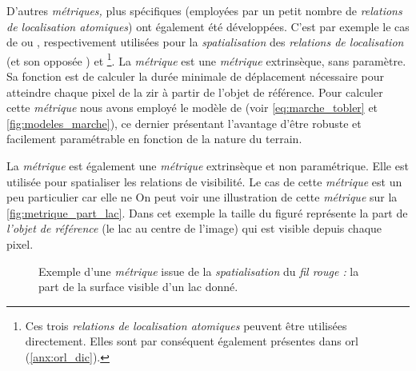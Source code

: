 D'autres \emph{métriques,} plus spécifiques (\ie employées par un
petit nombre de \emph{relations de localisation atomiques}) ont
également été développées. C'est par exemple le cas de
 ou , respectivement
utilisées pour la \emph{spatialisation} des \emph{relations de
  localisation}  (et son opposée
) et 
\footnote{Ces trois \emph{relations de localisation atomiques} peuvent
  être utilisées directement. Elles sont par conséquent également
  présentes dans \ac{orl} (\autoref{anx:orl_dic}).}. La
\emph{métrique}  est une \emph{métrique}
extrinsèque, sans paramètre. Sa fonction est de calculer la durée
minimale de déplacement nécessaire pour atteindre chaque pixel de la
\ac{zir} à partir de l'objet de référence. Pour calculer cette
\emph{métrique} nous avons employé le modèle de \textcite{Tobler1993}
(voir \autoref{eq:marche_tobler} et \autoref{fig:modeles_marche}), ce
dernier présentant l'avantage d'être robuste et facilement
paramétrable en fonction de la nature du terrain.

La \emph{métrique}  est également une
\emph{métrique} extrinsèque et non paramétrique. Elle est utilisée
pour spatialiser les relations de visibilité. Le cas de cette
\emph{métrique} est un peu particulier car elle ne 
%
On peut voir une illustration de cette \emph{métrique} sur la
\autoref{fig:metrique_part_lac}. Dans cet exemple la taille du figuré
représente la part de \emph{l'objet de référence} (le lac au centre de
l'image) qui est visible depuis chaque pixel.

\begin{figure}
  \centering
  
  \caption{Exemple d'une \emph{métrique} issue de la
    \emph{spatialisation} du \emph{fil rouge :} la part de la surface
    visible d'un lac donné.}
  \label{fig:metrique_part_lac}
\end{figure}

